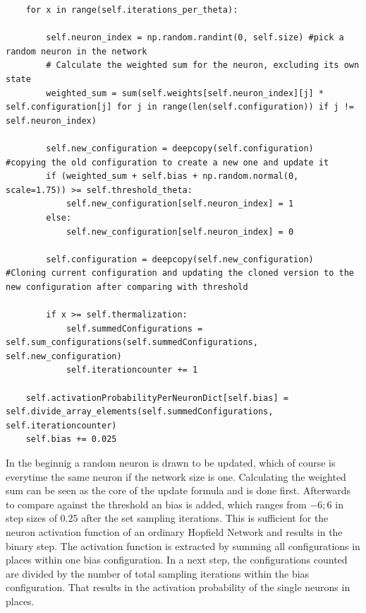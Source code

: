 \begin{lstlisting}
    for x in range(self.iterations_per_theta):
                    
        self.neuron_index = np.random.randint(0, self.size) #pick a random neuron in the network
        # Calculate the weighted sum for the neuron, excluding its own state
        weighted_sum = sum(self.weights[self.neuron_index][j] * self.configuration[j] for j in range(len(self.configuration)) if j != self.neuron_index)

        self.new_configuration = deepcopy(self.configuration)   #copying the old configuration to create a new one and update it
        if (weighted_sum + self.bias + np.random.normal(0, scale=1.75)) >= self.threshold_theta:          
            self.new_configuration[self.neuron_index] = 1
        else:
            self.new_configuration[self.neuron_index] = 0
            
        self.configuration = deepcopy(self.new_configuration)   #Cloning current configuration and updating the cloned version to the new configuration after comparing with threshold

        if x >= self.thermalization:  
            self.summedConfigurations = self.sum_configurations(self.summedConfigurations, self.new_configuration)    
            self.iterationcounter += 1
        
    self.activationProbabilityPerNeuronDict[self.bias] = self.divide_array_elements(self.summedConfigurations, self.iterationcounter)
    self.bias += 0.025
\end{lstlisting}
In the beginnig a random neuron is drawn to be updated, which of course is everytime the same neuron if the network size is one. 
Calculating the weighted sum can be seen as the core of the update formula and is done first.
Afterwards to compare against the threshold an bias is added, which ranges from \(-6; 6\) in step sizes of \(0.25\) after the set sampling iterations. 
This is sufficient for the neuron activation function of an ordinary Hopfield Network and results in the binary step. 
The activation function is extracted by summing all configurations in places within one bias configuration. 
In a next step, the configurations counted are divided by the number of total sampling iterations within the bias configuration.
That results in the activation probability of the single neurons in places. 

